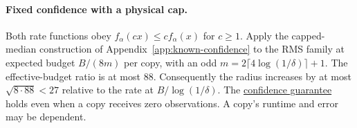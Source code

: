 \paragraph{Fixed confidence with a physical cap.}
Both rate functions obey $f_\alpha(cx)\le c f_\alpha(x)$ for $c\ge1$.
Apply the capped-median construction of Appendix~\ref{app:known-confidence}
to the RMS family at expected budget $B/(8m)$ per copy, with an odd
$m=2\lceil4\log(1/\delta)\rceil+1$.
The effective-budget ratio is at most $88$. Consequently the radius
increases by at most $\sqrt{8\cdot88}<27$ relative to the rate at
$B/\log(1/\delta)$. The
\href{https://github.com/davidiach/adaptive-threshold-estimation/blob/45e6f417c882038d7f4b8fc1b7e39f9d730a538c/lean/ThresholdHC/ShiftedPower/Confidence.lean}{confidence guarantee}
holds even when a copy receives zero
observations. A copy's runtime and error may be dependent.
